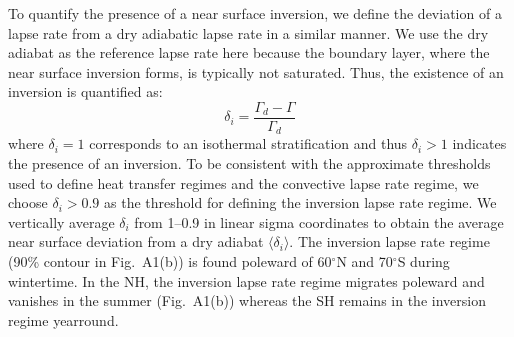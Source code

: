 \documentclass{ametsocV5}
\begin{document}
  To quantify the presence of a near surface inversion, we define the deviation of a lapse rate from a dry adiabatic lapse rate in a similar manner. We use the dry adiabat as the reference lapse rate here because the boundary layer, where the near surface inversion forms, is typically not saturated. Thus, the existence of an inversion is quantified as:
    \begin{equation}
      \delta_{i} = \frac{\Gamma_{d}-\Gamma}{\Gamma_{d}}
    \end{equation}
  where \(\delta_{i}=1\) corresponds to an isothermal stratification and thus \(\delta_{i}>1\) indicates the presence of an inversion. To be consistent with the approximate thresholds used to define heat transfer regimes and the convective lapse rate regime, we choose $\delta_i>0.9$ as the threshold for defining the inversion lapse rate regime. We vertically average \(\delta_{i}\) from 1--0.9 in linear sigma coordinates to obtain the average near surface deviation from a dry adiabat \(\langle \delta_{i} \rangle\). The inversion lapse rate regime (90\% contour in Fig.~A1(b)) is found poleward of 60$^{\circ}$N and 70$^{\circ}$S during wintertime. In the NH, the inversion lapse rate regime migrates poleward and vanishes in the summer (Fig.~A1(b)) whereas the SH remains in the inversion regime yearround.
\end{document}
